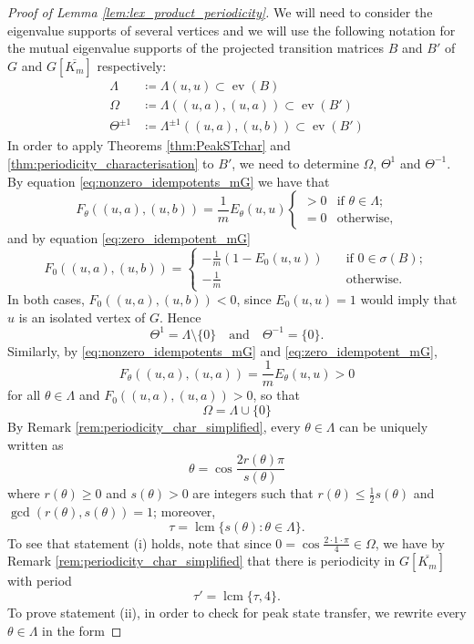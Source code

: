 \documentclass{article}
\numberwithin{equation}{section}
\DeclareMathOperator\ev{ev}
\DeclareMathOperator{\lcm}{lcm}
\begin{document}
\begin{proof}[Proof of Lemma \ref{lem:lex_product_periodicity}]
We will need to consider the eigenvalue supports of several vertices and we will use the following notation for the mutual eigenvalue supports of the projected transition matrices $B$ and $B'$ of $G$ and $G[\overline{K_m}]$ respectively:
\[
\begin{split}
\Lambda &\coloneq \Lambda(u,u) \subset \ev(B) \\
\Omega &\coloneq \Lambda((u,a),(u,a)) \subset \ev(B')\\
\Theta^{\pm 1} &\coloneq \Lambda^{\pm 1}((u,a),(u,b)) \subset \ev(B')
\end{split}
\]
In order to apply Theorems \ref{thm:PeakSTchar} and \ref{thm:periodicity_characterisation} to $B'$, we need to determine $\Omega$, $\Theta^{1}$ and $\Theta^{-1}$. By equation \eqref{eq:nonzero_idempotents_mG} we have that
\[
F_\theta((u,a),(u,b)) = \frac{1}{m}E_\theta (u,u) \begin{cases}
> 0 &\text{if $\theta \in \Lambda$;} \\
= 0 &\text{otherwise,}
\end{cases}
\]
and by equation \eqref{eq:zero_idempotent_mG}
\[
F_0((u,a),(u,b)) = \begin{cases}
- \frac{1}{m}(1 - E_0(u,u)) \quad &\text{if $0 \in \sigma(B)$}; \\
- \frac{1}{m} &\text{otherwise.}
\end{cases}
\]
In both cases, $F_0((u,a),(u,b)) < 0$, since $E_0(u,u) = 1$ would imply that $u$ is an isolated vertex of $G$. Hence
\[
\Theta^1 = \Lambda \setminus \{0\} \quad \text{and} \quad \Theta^{-1} = \{0\}.
\]
Similarly, by \eqref{eq:nonzero_idempotents_mG} and \eqref{eq:zero_idempotent_mG},
\[
F_\theta((u,a),(u,a)) = \frac{1}{m}E_\theta(u,u) > 0
\]
for all $\theta \in \Lambda$ and $F_0((u,a),(u,a)) > 0$, so that
\[
\Omega = \Lambda \cup \{0\}
\]
By Remark \ref{rem:periodicity_char_simplified}, every $\theta \in \Lambda$ can be uniquely written as
\[
\theta = \cos \frac{2r(\theta)\pi}{s(\theta)}
\]
where $r(\theta) \geq 0$ and $s(\theta) > 0$ are integers such that $r(\theta) \leq \frac{1}{2}s(\theta)$ and $\gcd(r(\theta),s(\theta)) = 1$; moreover,
\[
\tau = \lcm\{s(\theta) : \theta \in \Lambda\}.
\]
To see that statement (i) holds, note that since $0 = \cos \frac{2\cdot 1 \cdot \pi}{4} \in \Omega$, we have by Remark \ref{rem:periodicity_char_simplified} that there is periodicity in $G[\overline{K_m}]$ with period
\[
\tau' = \lcm\{\tau,4\}.
\]
To prove statement (ii), in order to check for peak state transfer, we rewrite every $\theta \in \Lambda$ in the form

\end{proof}
\end{document}
